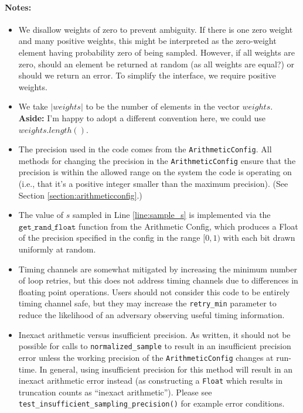 \documentclass[11pt]{article}
\theoremstyle{definition}
\newcommand{\mt}{\mathtt}
\newcommand{\aside}[1]{{\color{teal} \textbf{Aside:} #1}}
\begin{document}
\paragraph{Notes:}
\begin{itemize}
    \item We disallow weights of zero to prevent ambiguity. If there is one zero weight and many positive weights, this might be interpreted as the zero-weight element having probability zero of being sampled. However, if all weights are zero, should an element be returned at random (as all weights are equal?) or should we return an error. To simplify the interface, we require positive weights. 
    \item We take $|weights|$ to be the number of elements in the vector $weights$. \aside{I'm happy to adopt a different convention here, we could use $weights.length()$.}
    \item The precision used in the code comes from the {\tt ArithmeticConfig}. All methods for changing the precision in the {\tt ArithmeticConfig} ensure that the precision is within the allowed range on the system the code is operating on (i.e., that it's a positive integer smaller than the maximum precision). (See Section \ref{section:arithmeticconfig}.)
    \item The value of $s$ sampled in Line \ref{line:sample_s} is implemented via the $\mt{get\_rand\_float}$ function from the Arithmetic Config, which produces a Float of the precision specified in the config in the range $[0,1)$ with each bit drawn uniformly at random. 
    \item Timing channels are somewhat mitigated by increasing the minimum number of loop retries, but this does not address timing channels due to differences in floating point operations. Users should not consider this code to be entirely timing channel safe, but they may increase the {\tt retry\_min} parameter to reduce the likelihood of an adversary observing useful timing information.
    \item Inexact arithmetic versus insufficient precision. As written, it should not be possible for calls to {\tt normalized\_sample} to result in an insufficient precision error unless the working precision of the {\tt ArithmeticConfig} changes at run-time. In general, using insufficient precision for this method will result in an inexact arithmetic error instead (as constructing a {\tt Float} which results in truncation counts as ``inexact arithmetic''). Please see {\tt test\_insufficient\_sampling\_precision()} for example error conditions.
\end{itemize}
\end{document}
